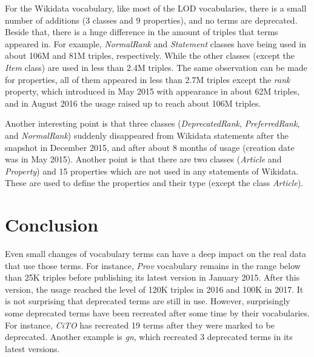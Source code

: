 For the Wikidata vocabulary, like most of the LOD vocabularies, there is a small number of additions (3 classes and 9 properties), and no terms are deprecated. Beside that, there is a huge difference in the amount of triples that terms appeared in. For example, \textit{NormalRank} and \textit{Statement} classes have being used in about 106M and 81M triples, respectively. While the other classes (except the \textit{Item} class) are used in less than 2.4M triples. The same observation can be made for properties, all of them appeared in less than 2.7M triples except the \textit{rank} property, which introduced in May 2015 with appearance in about 62M triples, and in August 2016 the usage raised up to reach about 106M triples.

Another interesting point is that  three classes (\textit{DeprecatedRank}, \textit{PreferredRank}, and \textit{NormalRank}) suddenly disappeared from Wikidata statements after the snapshot in December 2015, and after about 8 months of usage (creation date was in May 2015).
% 
Another point is that there are two classes (\textit{Article} and \textit{Property}) and 15 properties which are not used in any statements of Wikidata. 
These are used to define the properties and their type (except the class \textit{Article}).

\section{Conclusion}
Even small changes of vocabulary terms can have a deep impact on the real data that use those terms. For instance, \textit{Prov} vocabulary remains in the range below than 25K triples before publishing its latest version in January 2015. After this version, the usage reached the level of 120K triples in 2016 and 100K in 2017.
 It is not surprising that deprecated terms are still in use. 
 However, surprisingly some deprecated terms have been recreated after some time by their vocabularies. 
 For instance, \textit{CiTO} has recreated 19 terms after they were marked to be deprecated. 
 Another example is \textit{gn}, which recreated 3 deprecated terms in its latest versions.





